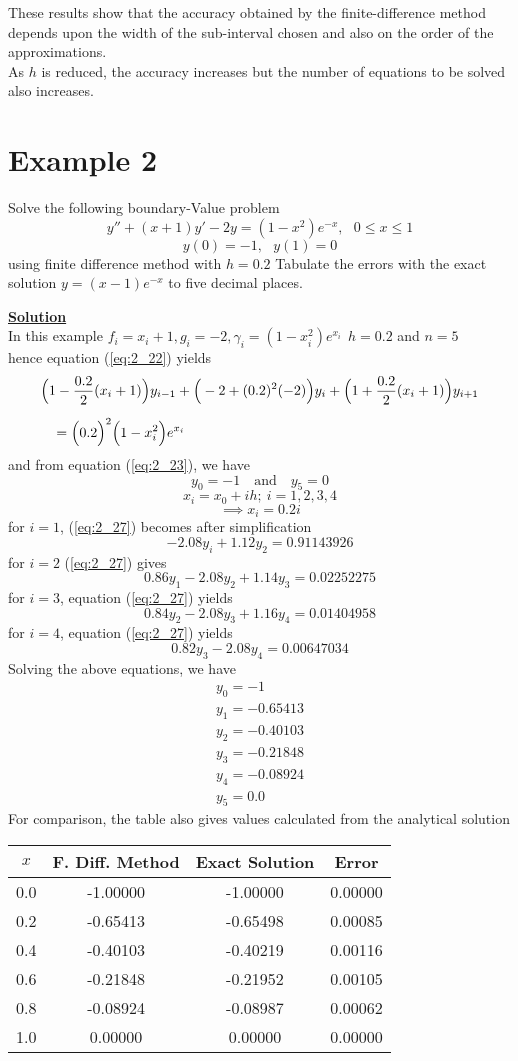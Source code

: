 \documentclass[12pt]{report}
\newcommand{\ubt}[1]{\textbf{\underline{#1}}}
\newcommand{\sps}{\\[0.2cm]}
\newcommand{\refn}[1]{(\ref{#1})}
\newcommand{\refx}[1]{\refn{eq:#1}}
\newcommand{\NI}{\noindent}
\newcommand{\sprime}{'}
\newcommand{\dprime}{''}
\begin{document}
	These results show that the accuracy obtained by the finite-difference method depends upon the width of the sub-interval chosen and also on the order of the approximations.\sps
	
	\NI As $h$ is reduced, the accuracy increases but the number of equations to be solved also increases.
	\section*{Example 2}
	Solve the following boundary-Value problem 
	\begin{equation*}
		y\dprime + (x+1)y\sprime - 2y = (1-x^2)e^{-x}, ~~~ 0\leq x \leq 1
	\end{equation*}
	$$y(0) = -1, ~~~ y(1) = 0$$
	using finite difference method with $h=0.2$ Tabulate the errors with the exact solution $y=(x-1)e^{-x}$ to five decimal places.
	
	\NI\ubt{Solution}\sps
	In this example $f_i = x_i + 1, g_i = -2, \gamma_i = (1-x^2_i)e^{x_i} ~~ h= 0.2$ and $n=5$\sps
	hence equation \refx{2_22} yields
	\begin{eqnarray}
		\Big(1 - \frac{0.2}{2}(x_i + 1)\Big)y_{i-1} + \Big(-2 + (0.2)^2(-2)\Big)y_i + \Big(1+\frac{0.2}{2}(x_i+1)\Big)y_{i+1}\notag\sps
		= \Big(0.2\Big)^2\Big(1-x^2_i\Big)e^{x_i}~~~~~~~~~~~~~~~~~~~~~~~~~~~~~~~~~~~~~~~~~~~~~~~~~~~~~~~~~~~~~~~\label{eq:2_27}
	\end{eqnarray}
	and from equation \refx{2_23}, we have
	$$y_0 = -1 ~~~\text{ and }~~~ y_5 = 0$$
	$$x_i = x_0 + ih; ~ i=1,2,3,4$$
	$$\implies x_i = 0.2i$$
	for $i=1$, \refx{2_27} becomes after simplification
	$$
		-2.08y_i + 1.12y_2 = 0.91143926
	$$
	for $i=2$ \refx{2_27} gives
	$$
		0.86y_1 - 2.08y_2 + 1.14y_3 = 0.02252275
	$$
	for $i=3$, equation \refx{2_27} yields
	$$
		0.84y_2 - 2.08y_3 + 1.16y_4 = 0.01404958
	$$
	for $i=4$, equation \refx{2_27} yields
	$$
		0.82y_3 - 2.08y_4 = 0.00647034
	$$
	Solving the above equations, we have
	\begin{equation*}
		\begin{array}{l}
			y_0 = -1\\
			y_1 = -0.65413\\
			y_2 = -0.40103\\
			y_3 = -0.21848\\
			y_4 = -0.08924\\
			y_5 = 0.0
		\end{array}
	\end{equation*}
	\newpage
	For comparison, the table also gives values calculated from the analytical solution
	\begin{longtable}{c|c|c|c}
		$x$ & F. Diff. Method & Exact Solution & Error\\ \hline
		0.0 & -1.00000 & -1.00000 & 0.00000\\
		0.2 & -0.65413 & -0.65498 & 0.00085\\
		0.4 & -0.40103 & -0.40219 & 0.00116\\
		0.6 & -0.21848 & -0.21952 & 0.00105\\
		0.8	& -0.08924 & -0.08987 & 0.00062\\
		1.0 & 0.00000 & 0.00000 & 0.00000
	\end{longtable}
\end{document}
